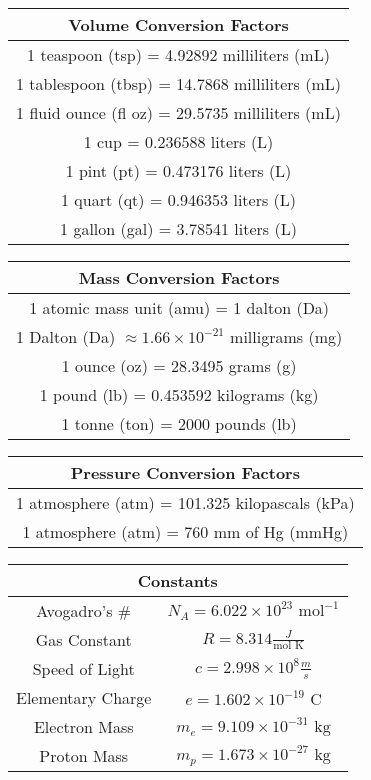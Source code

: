 \documentclass[10pt, roman]{article}
\begin{document}
\hfill
\begin{minipage}{0.48\textwidth}
\centering
\begin{tabular}{|c|}
\hline
\textbf{Volume Conversion Factors} \\
\hline
1 teaspoon (tsp) = 4.92892 milliliters (mL) \\
1 tablespoon (tbsp) = 14.7868 milliliters (mL) \\
1 fluid ounce (fl oz) = 29.5735 milliliters (mL) \\
1 cup = 0.236588 liters (L) \\
1 pint (pt) = 0.473176 liters (L) \\
1 quart (qt) = 0.946353 liters (L) \\
1 gallon (gal) = 3.78541 liters (L) \\
\hline
\end{tabular}

\vspace{10pt}

\begin{tabular}{|c|}
\hline
\textbf{Mass Conversion Factors} \\
\hline
1 atomic mass unit (amu) = 1 dalton (Da) \\
1 Dalton (Da) $\approx 1.66 \times 10^{-21}$ milligrams (mg) \\
1 ounce (oz) = 28.3495 grams (g) \\
1 pound (lb) = 0.453592 kilograms (kg) \\
1 tonne (ton) = 2000 pounds (lb) \\
\hline
\end{tabular}

\vspace{10pt}

\begin{tabular}{|c|}
\hline
\textbf{Pressure Conversion Factors} \\
\hline
1 atmosphere (atm) = 101.325 kilopascals (kPa) \\
1 atmosphere (atm) = 760 mm of Hg (mmHg) \\
\hline
\end{tabular}

\vspace{10pt}

\begin{tabular}{|c|c|}
\hline
\multicolumn{2}{|c|}{\textbf{Constants}} \\
\hline
Avogadro’s \# & $N_A = 6.022 \times 10^{23} \text{ mol}^{-1}$ \\
Gas Constant & $R = 8.314 \frac{J}{\text{mol K}}$ \\
Speed of Light & $c = 2.998 \times 10^{8} \frac{m}{s}$ \\
Elementary Charge & $e = 1.602 \times 10^{-19} \text{ C}$ \\
Electron Mass & $m_e = 9.109 \times 10^{-31} \text{ kg}$ \\
Proton Mass & $m_p = 1.673 \times 10^{-27} \text{ kg}$ \\
\hline
\end{tabular}


\end{minipage}
\end{document}
